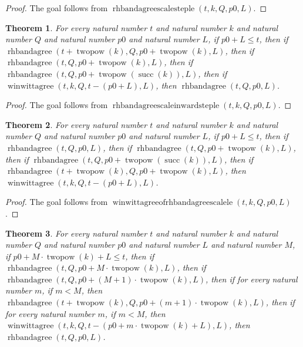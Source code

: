 \documentclass[11pt]{article}
\newtheorem{theorem}{Theorem}[section]
\theoremstyle{definition}
\begin{document}
\begin{proof}
The goal follows from \(\operatorname{rhbandagreescalesteple}(t, k, Q, p0, L)\).
\end{proof}
\begin{theorem}
\label{ll:paper:rhbandagree-scale-inward-step-le}
For every natural number \(t\) and natural number \(k\) and natural number \(Q\) and natural number \(p0\) and natural number \(L\), if \(p0 + L \le t\), then if \(\operatorname{rhbandagree}(t + \operatorname{twopow}(k), Q, p0 + \operatorname{twopow}(k), L)\), then if \(\operatorname{rhbandagree}(t, Q, p0 + \operatorname{twopow}(k), L)\), then if \(\operatorname{rhbandagree}(t, Q, p0 + \operatorname{twopow}(\operatorname{succ}(k)), L)\), then if \(\operatorname{winwittagree}(t, k, Q, t - (p0 + L), L)\), then \(\operatorname{rhbandagree}(t, Q, p0, L)\).
\end{theorem}
\begin{proof}
The goal follows from \(\operatorname{rhbandagreescaleinwardsteple}(t, k, Q, p0, L)\).
\end{proof}
\begin{theorem}
\label{ll:paper:winwittagree-of-rhbandagree-scale-le}
For every natural number \(t\) and natural number \(k\) and natural number \(Q\) and natural number \(p0\) and natural number \(L\), if \(p0 + L \le t\), then if \(\operatorname{rhbandagree}(t, Q, p0, L)\), then if \(\operatorname{rhbandagree}(t, Q, p0 + \operatorname{twopow}(k), L)\), then if \(\operatorname{rhbandagree}(t, Q, p0 + \operatorname{twopow}(\operatorname{succ}(k)), L)\), then if \(\operatorname{rhbandagree}(t + \operatorname{twopow}(k), Q, p0 + \operatorname{twopow}(k), L)\), then \(\operatorname{winwittagree}(t, k, Q, t - (p0 + L), L)\).
\end{theorem}
\begin{proof}
The goal follows from \(\operatorname{winwittagreeofrhbandagreescalele}(t, k, Q, p0, L)\).
\end{proof}
\begin{theorem}
\label{ll:paper:rhbandagree-scale-inward-steps}
For every natural number \(t\) and natural number \(k\) and natural number \(Q\) and natural number \(p0\) and natural number \(L\) and natural number \(M\), if \(p0 + M \cdot \operatorname{twopow}(k) + L \le t\), then if \(\operatorname{rhbandagree}(t, Q, p0 + M \cdot \operatorname{twopow}(k), L)\), then if \(\operatorname{rhbandagree}(t, Q, p0 + (M + 1) \cdot \operatorname{twopow}(k), L)\), then if for every natural number \(m\), if \(m < M\), then \(\operatorname{rhbandagree}(t + \operatorname{twopow}(k), Q, p0 + (m + 1) \cdot \operatorname{twopow}(k), L)\), then if for every natural number \(m\), if \(m < M\), then \(\operatorname{winwittagree}(t, k, Q, t - (p0 + m \cdot \operatorname{twopow}(k) + L), L)\), then \(\operatorname{rhbandagree}(t, Q, p0, L)\).
\end{theorem}
\end{document}

